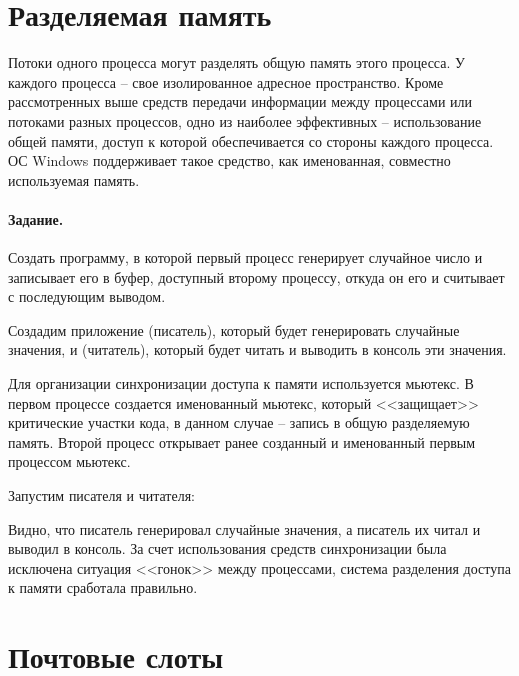 \section{Разделяемая память}

Потоки одного процесса могут разделять общую память этого процесса. У каждого процесса -- свое изолированное адресное пространство. Кроме рассмотренных выше средств передачи информации между процессами или потоками разных процессов, одно из наиболее эффективных – использование общей памяти, доступ к которой обеспечивается со стороны каждого процесса. ОС Windows поддерживает такое средство, как именованная, совместно используемая память.

\paragraph{Задание.} Создать программу, в которой первый процесс генерирует случайное число и записывает его в буфер, доступный второму процессу, откуда он его и считывает с последующим выводом.

Создадим приложение  (писатель), который будет генерировать случайные значения, и  (читатель), который будет читать и выводить в консоль эти значения.

Для организации синхронизации доступа к памяти используется мьютекс. В первом процессе создается именованный мьютекс, который <<защищает>> критические участки кода, в данном случае -- запись в общую разделяемую память. Второй процесс открывает ранее созданный и именованный первым процессом мьютекс.





Запустим писателя и читателя:





Видно, что писатель генерировал случайные значения, а писатель их читал и выводил в консоль. За счет использования средств синхронизации была исключена ситуация <<гонок>> между процессами, система разделения доступа к памяти сработала правильно.

\section{Почтовые слоты}


